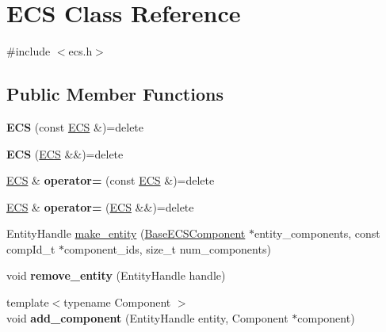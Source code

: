 \hypertarget{classECS}{}\section{E\+CS Class Reference}
\label{classECS}


{\ttfamily \#include $<$ecs.\+h$>$}

\subsection*{Public Member Functions}
\begin{DoxyCompactItemize}
\item 
\mbox{\label{classECS_a316cc3417a9eb09d25c2598b4b352fe0}} 
{\bfseries E\+CS} (const \hyperlink{classECS}{E\+CS} \&)=delete
\item 
\mbox{\label{classECS_afc231af38c79ef41625ba428079ba038}} 
{\bfseries E\+CS} (\hyperlink{classECS}{E\+CS} \&\&)=delete
\item 
\mbox{\label{classECS_adecac823806246bc357bc786bfaf2f0f}} 
\hyperlink{classECS}{E\+CS} \& {\bfseries operator=} (const \hyperlink{classECS}{E\+CS} \&)=delete
\item 
\mbox{\label{classECS_a6f7f7d2e973bb4d206b3f8fae0b429d3}} 
\hyperlink{classECS}{E\+CS} \& {\bfseries operator=} (\hyperlink{classECS}{E\+CS} \&\&)=delete
\item 
Entity\+Handle \hyperlink{classECS_aeb3ab746cd0f198cd86631489e438ea6}{make\+\_\+entity} (\hyperlink{classBaseECSComponent}{Base\+E\+C\+S\+Component} $\ast$entity\+\_\+components, const comp\+Id\+\_\+t $\ast$component\+\_\+ids, size\+\_\+t num\+\_\+components)
\item 
\mbox{\label{classECS_ab864271724be8395bac46bf276571a3c}} 
void {\bfseries remove\+\_\+entity} (Entity\+Handle handle)
\item 
\mbox{\label{classECS_a46b26cb09b107d34cfb761e0a30e35d7}} 
{\footnotesize template$<$typename Component $>$ }\\void {\bfseries add\+\_\+component} (Entity\+Handle entity, Component $\ast$component)
\item 
\mbox{\label{classECS_a59a523514ddf60755b3cbe7bc5f1ed6f}} 

\end{DoxyCompactItemize}
